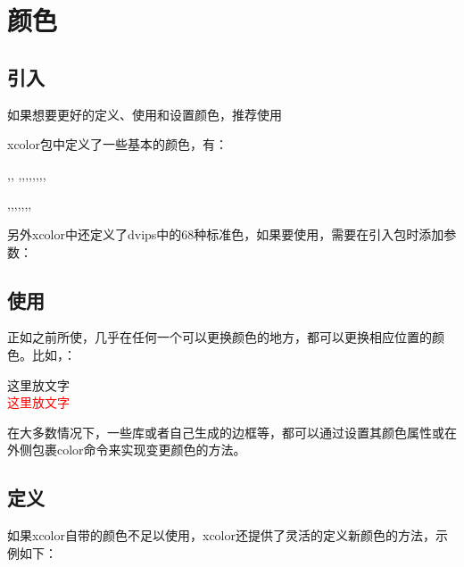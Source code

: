 
\section{颜色}\label{sec:color}
\subsection{引入}

如果想要更好的定义、使用和设置颜色，推荐使用%
\begin{texcode}
\usepackage{xcolor}
\end{texcode}
xcolor包中定义了一些基本的颜色，有：

{\color{black}{black}},{\color{blue}{blue}}, {\color{brown}{brown}},{\color{cyan}{cyan}},{\color{darkgray}{darkgray}},{\color{gray}{gray}},{\color{green}{green}},{\color{lightgray}{lightgray}},{\color{lime}{lime}},{\color{magenta}{magenta}},{\color{olive}{olive}}

{\color{orange}{orange}},{\color{pink}{pink}},{\color{purple}{purple}},{\color{red}{red}},{\color{teal}{teal}},{\color{violet}{violet}},{\color{white}{white}},{\color{yellow}{yellow}}

另外xcolor中还定义了dvips中的68种标准色，如果要使用，需要在引入包时添加参数：
\begin{texcode}
\usepackage[dvipsnames]{xcolor}
\end{texcode}

\subsection{使用}
正如之前所使，几乎在任何一个可以更换颜色的地方，都可以更换相应位置的颜色。比如，{\color{red}{改变文字的颜色}}：
\begin{texshow}
{\color{red}这里放文字}\\
\textcolor{red}{这里放文字}%
\end{texshow}

在大多数情况下，一些库或者自己生成的边框等，都可以通过设置其颜色属性或在外侧包裹color命令来实现变更颜色的方法。

\subsection{定义}
如果xcolor自带的颜色不足以使用，xcolor还提供了灵活的定义新颜色的方法，示例如下：

\begin{texcode}
\end{texcode}

